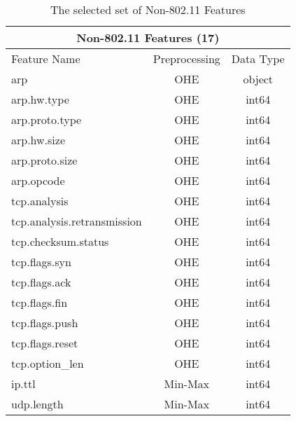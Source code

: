\begin{table}[H]
\centering
\begin{tabular}{lcc}
\hline
\multicolumn{3}{c}{\textbf{Non-802.11 Features (17)}} \\ \hline
Feature Name & Preprocessing & Data Type \\ \hline
arp & OHE & object \\
arp.hw.type & OHE & int64 \\
arp.proto.type & OHE & int64 \\
arp.hw.size & OHE & int64 \\
arp.proto.size & OHE & int64 \\
arp.opcode & OHE & int64 \\
tcp.analysis & OHE & int64 \\
tcp.analysis.retransmission & OHE & int64 \\
tcp.checksum.status & OHE & int64 \\
tcp.flags.syn & OHE & int64 \\
tcp.flags.ack & OHE & int64 \\
tcp.flags.fin & OHE & int64 \\
tcp.flags.push & OHE & int64 \\
tcp.flags.reset & OHE & int64 \\
tcp.option\_len & OHE & int64 \\
ip.ttl & Min-Max & int64 \\
udp.length & Min-Max & int64 \\ \hline
\end{tabular}
\caption{The selected set of Non-802.11 Features}
\label{tab:non80211}
\end{table}
